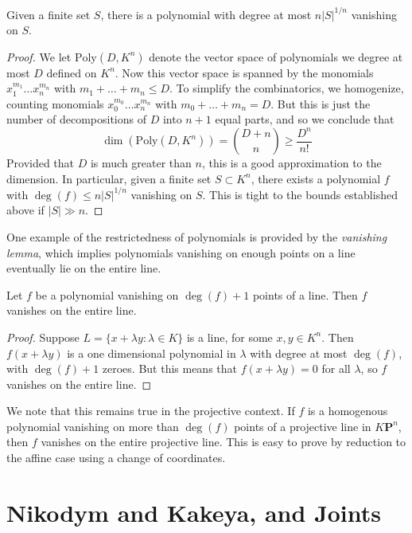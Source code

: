\begin{theorem}
	Given a finite set $S$, there is a polynomial with degree at most $n|S|^{1/n}$ vanishing on $S$.
\end{theorem}
\begin{proof}
	We let $\text{Poly}(D,K^n)$ denote the vector space of polynomials we degree at most $D$ defined on $K^n$. Now this vector space is spanned by the monomials $x_1^{m_1} \dots x_n^{m_n}$ with $m_1 + \dots + m_n \leq D$. To simplify the combinatorics, we homogenize, counting monomials $x_0^{m_0} \dots x_n^{m_n}$ with $m_0 + \dots + m_n = D$. But this is just the number of decompositions of $D$ into $n+1$ equal parts, and so we conclude that
	\[ \dim \left( \text{Poly}(D,K^n) \right) = {D + n \choose n} \geq \frac{D^n}{n!} \]
	Provided that $D$ is much greater than $n$, this is a good approximation to the dimension. In particular, given a finite set $S \subset K^n$, there exists a polynomial $f$ with $\deg(f) \leq n |S|^{1/n}$ vanishing on $S$. This is tight to the bounds established above if $|S| \gg n$.
\end{proof}

One example of the restrictedness of polynomials is provided by the {\it vanishing lemma}, which implies polynomials vanishing on enough points on a line eventually lie on the entire line.

\begin{theorem}
	Let $f$ be a polynomial vanishing on $\deg(f) + 1$ points of a line. Then $f$ vanishes on the entire line.
\end{theorem}
\begin{proof}
	Suppose $L = \{ x + \lambda y: \lambda \in K \}$ is a line, for some $x,y \in K^n$. Then $f(x + \lambda y)$ is a one dimensional polynomial in $\lambda$ with degree at most $\deg(f)$, with $\deg(f) + 1$ zeroes. But this means that $f(x + \lambda y) = 0$ for all $\lambda$, so $f$ vanishes on the entire line.
\end{proof}

We note that this remains true in the projective context. If $f$ is a homogenous polynomial vanishing on more than $\deg(f)$ points of a projective line in $K \mathbf{P}^n$, then $f$ vanishes on the entire projective line. This is easy to prove by reduction to the affine case using a change of coordinates.

\section{Nikodym and Kakeya, and Joints}

